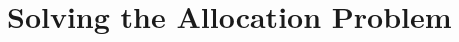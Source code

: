 \documentclass{article}
\begin{document}



\section{Solving the Allocation Problem}
\end{document}
